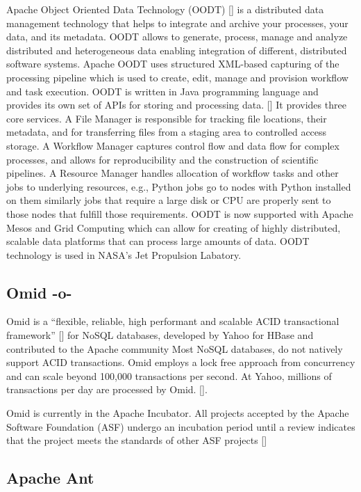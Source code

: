 Apache Object Oriented Data Technology (OODT) [\cite{www-oodt}] is a
distributed data management technology that helps to integrate and
archive your processes, your data, and its metadata. OODT allows to
generate, process, manage and analyze distributed and heterogeneous
data enabling integration of different, distributed software
systems. Apache OODT uses structured XML-based capturing of the
processing pipeline which is used to create, edit, manage and
provision workflow and task execution. OODT is written in Java
programming language and provides its own set of APIs for storing and
processing data. [\cite{www-oodt-documentation}] It provides three core
services. A File Manager is responsible for tracking file locations,
their metadata, and for transferring files from a staging area to
controlled access storage. A Workflow Manager captures control flow
and data flow for complex processes, and allows for reproducibility
and the construction of scientific pipelines. A Resource Manager
handles allocation of workflow tasks and other jobs to underlying
resources, e.g., Python jobs go to nodes with Python installed on them
similarly jobs that require a large disk or CPU are properly sent to
those nodes that fulfill those requirements. OODT is now supported
with Apache Mesos and Grid Computing which can allow for creating of
highly distributed, scalable data platforms that can process large
amounts of data. OODT technology is used in NASA's Jet Propulsion
Labatory.

\subsection{Omid -o-}

Omid is a ``flexible, reliable, high performant and scalable ACID
transactional framework'' [\cite{www-apacheomid}] for NoSQL databases,
developed by Yahoo for HBase and contributed to the Apache community
Most NoSQL databases, do not natively support ACID transactions. Omid
employs a lock free approach from concurrency and can scale beyond
100,000 transactions per second. At Yahoo, millions of transactions
per day are processed by Omid. [\cite{www-yahooomid}].

Omid is currently in the Apache Incubator.  All projects accepted by
the Apache Software Foundation (ASF) undergo an incubation period
until a review indicates that the project meets the standards of other
ASF projects [\cite{www-apacheincubator}]


\subsection{Apache Ant}

